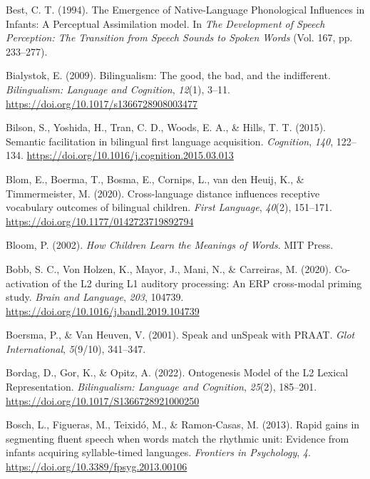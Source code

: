 \documentclass[
  12pt,
  b5paperpaper,
  twoside]{scrreprt}
\newlength{\cslhangindent}
\newlength{\cslentryspacingunit} %
\newenvironment{CSLReferences}[2] %
 {%
  \setlength{\parindent}{0pt}
  \ifodd #1
  \let\oldpar\par
  \def\par{\hangindent=\cslhangindent\oldpar}
  \fi
  \setlength{\parskip}{#2\cslentryspacingunit}
 }%
 {}
\begin{document}
\begin{CSLReferences}{1}{0}
\leavevmode{}%
Best, C. T. (1994). The {Emergence} of {Native-Language Phonological
Influences} in {Infants}: {A Perceptual Assimilation} model. In
\emph{The {Development} of {Speech Perception}: {The Transition} from
{Speech Sounds} to {Spoken Words}} (Vol. 167, pp. 233--277).

\leavevmode{}%
Bialystok, E. (2009). Bilingualism: The good, the bad, and the
indifferent. \emph{Bilingualism: Language and Cognition}, \emph{12}(1),
3--11. \url{https://doi.org/10.1017/s1366728908003477}

\leavevmode{}%
Bilson, S., Yoshida, H., Tran, C. D., Woods, E. A., \& Hills, T. T.
(2015). Semantic facilitation in bilingual first language acquisition.
\emph{Cognition}, \emph{140}, 122--134.
\url{https://doi.org/10.1016/j.cognition.2015.03.013}

\leavevmode{}%
Blom, E., Boerma, T., Bosma, E., Cornips, L., van den Heuij, K., \&
Timmermeister, M. (2020). Cross-language distance influences receptive
vocabulary outcomes of bilingual children. \emph{First Language},
\emph{40}(2), 151--171. \url{https://doi.org/10.1177/0142723719892794}

\leavevmode{}%
Bloom, P. (2002). \emph{How {Children Learn} the {Meanings} of {Words}}.
{MIT Press}.

\leavevmode{}%
Bobb, S. C., Von Holzen, K., Mayor, J., Mani, N., \& Carreiras, M.
(2020). Co-activation of the {L2} during {L1} auditory processing: An
{ERP} cross-modal priming study. \emph{Brain and Language}, \emph{203},
104739. \url{https://doi.org/10.1016/j.bandl.2019.104739}

\leavevmode{}%
Boersma, P., \& Van Heuven, V. (2001). Speak and {unSpeak} with {PRAAT}.
\emph{Glot International}, \emph{5}(9/10), 341--347.

\leavevmode{}%
Bordag, D., Gor, K., \& Opitz, A. (2022). Ontogenesis {Model} of the {L2
Lexical Representation}. \emph{Bilingualism: Language and Cognition},
\emph{25}(2), 185--201. \url{https://doi.org/10.1017/S1366728921000250}

\leavevmode{}%
Bosch, L., Figueras, M., Teixidó, M., \& Ramon-Casas, M. (2013). Rapid
gains in segmenting fluent speech when words match the rhythmic unit:
Evidence from infants acquiring syllable-timed languages.
\emph{Frontiers in Psychology}, \emph{4}.
\url{https://doi.org/10.3389/fpsyg.2013.00106}


\end{CSLReferences}
\end{document}

